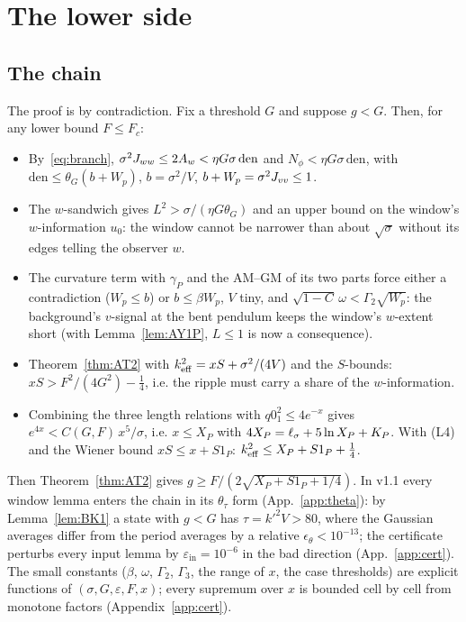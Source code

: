 \section{The lower side}
\label{sec:lower}

\subsection{The chain}
The proof is by contradiction. Fix a threshold $G$ and suppose $g<G$. Then, for any lower bound $F\le F_c$:
\begin{itemize}
\item[(L1)] By~\eqref{eq:branch}, $\sigma^2J_{ww}\le2A_w<\eta G\sigma\,\mathrm{den}$ and $N_\phi<\eta G\sigma\,\mathrm{den}$, with $\mathrm{den}\le\theta_G(b+W_p)$,
$b=\sigma^2/V$, $b+W_p=\sigma^2J_{vv}\le1$.
\item[(L2)] The $w$-sandwich gives $L^2>\sigma/(\eta G\theta_G)$ and an upper bound on the window's $w$-information $u_0$: the window cannot be
narrower than about $\sqrt\sigma$ without its edges telling the observer $w$.
\item[(L3)] The curvature term with $\gamma_P$ and the AM--GM of its two parts force either a contradiction ($W_p\le b$) or
$b\le\beta W_p$, $V$ tiny, and $\sqrt{1-C}\,\omega<\Gamma_2\sqrt{W_p}$: the background's $v$-signal at the bent pendulum keeps the window's
$w$-extent short (with Lemma~\ref{lem:AY1P}, $L\le1$ is now a consequence).
\item[(L4)] Theorem~\ref{thm:AT2} with $k_{\mathrm{eff}}^2=xS+\sigma^2/(4V)$ and the $S$-bounds: $xS>F^2/(4G^2)-\tfrac14$, i.e. the ripple must carry a
share of the $w$-information.
\item[(L5)] Combining the three length relations with $q0_1^2\le4e^{-x}$ gives $e^{4x}<C(G,F)\,x^5/\sigma$, i.e. $x\le X_P$ with
$4X_P=\ell_\sigma+5\ln X_P+K_P$. With (L4) and the Wiener bound $xS\le x+S1_P$: $k_{\mathrm{eff}}^2\le X_P+S1_P+\tfrac14$.
\end{itemize}
Then Theorem~\ref{thm:AT2} gives $g\ge F/(2\sqrt{X_P+S1_P+1/4})$.
In v1.1 every window lemma enters the chain in its $\theta_\tau$ form (App.~\ref{app:theta}): by Lemma~\ref{lem:BK1} a state with $g<G$ has
$\tau=k'^2V>80$, where the Gaussian averages differ from the period averages by a relative $\epsilon_\theta<10^{-13}$; the certificate perturbs every input
lemma by $\varepsilon_{\mathrm{in}}=10^{-6}$ in the bad direction (App.~\ref{app:cert}). The small constants ($\beta$, $\omega$, $\Gamma_2$, $\Gamma_3$, the range of $x$,
the case thresholds) are explicit functions of $(\sigma,G,\varepsilon,F,x)$; every supremum over $x$ is bounded cell by cell from
monotone factors (Appendix~\ref{app:cert}).

